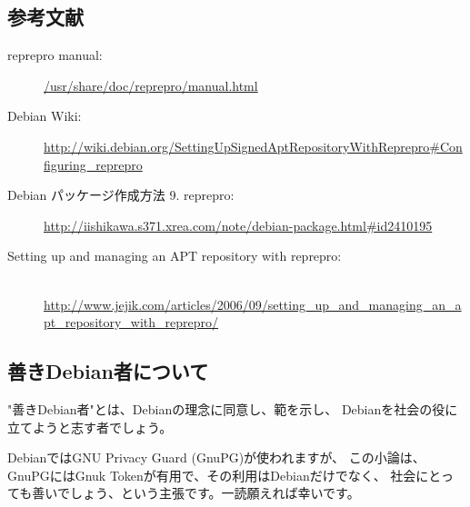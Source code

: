 \documentclass[mingoth,a4paper,twoside]{jsarticle}
\begin{document}
\vspace{-.5em}
\subsection*{参考文献}
{\scriptsize{
    \begin{description}
    \item[reprepro manual:] \url{/usr/share/doc/reprepro/manual.html}
    \item[Debian Wiki:] \url{http://wiki.debian.org/SettingUpSignedAptRepositoryWithReprepro#Configuring_reprepro}
    \item[Debian パッケージ作成方法 9. reprepro:] \url{http://iishikawa.s371.xrea.com/note/debian-package.html#id2410195}
    \item[Setting up and managing an APT repository with reprepro:] 　\\
      \url{http://www.jejik.com/articles/2006/09/setting_up_and_managing_an_apt_repository_with_reprepro/}
    \end{description}
  }}
\pagebreak

\subsection{善きDebian者について}
"善きDebian者"とは、Debianの理念に同意し、範を示し、
Debianを社会の役に立てようと志す者でしょう。

DebianではGNU Privacy Guard (GnuPG)が使われますが、
この小論は、GnuPGにはGnuk Tokenが有用で、その利用はDebianだけでなく、
社会にとっても善いでしょう、という主張です。一読願えれば幸いです。
\end{document}
